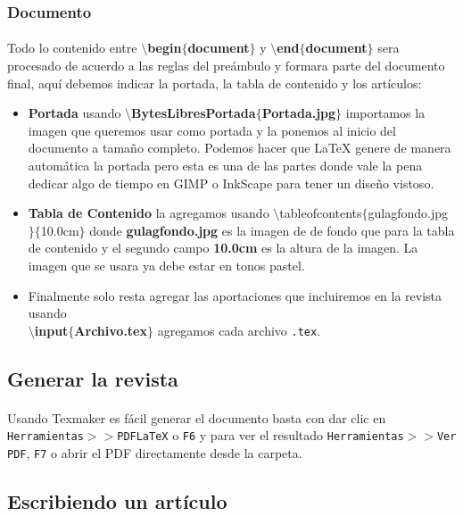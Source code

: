 \subsubsection*{Documento}
\paragraph{} Todo lo contenido entre \textbf{ $\setminus$begin$\{$document$\}$} y \textbf{ $\setminus$end$\{$document$\}$} sera procesado de acuerdo a las reglas del preámbulo y formara parte del documento final, aquí debemos indicar la portada, la tabla de contenido y los artículos:
\begin{itemize}
	\item \textbf{Portada} usando \textbf{$\setminus$BytesLibresPortada$\{$Portada.jpg$\}$} importamos la imagen que queremos usar como portada y la ponemos al inicio del documento a tamaño completo. Podemos hacer que \LaTeX{} genere de manera automática la portada pero esta es una de las partes donde vale la pena dedicar algo de tiempo en GIMP o InkScape para tener un diseño vistoso.
	\item \textbf{Tabla de Contenido} la agregamos usando $\setminus$tableofcontents$\{$gulagfondo.jpg$\}\{$10.0cm$\}$ donde \textbf{gulagfondo.jpg} es la imagen de de fondo que para la tabla de contenido y el segundo campo \textbf{10.0cm} es la altura de la imagen. La imagen que se usara ya debe estar en tonos pastel.
	\item Finalmente solo resta agregar las aportaciones que incluiremos en la revista usando \\ \textbf{$\setminus$input$\{$Archivo.tex$\}$} agregamos cada archivo \texttt{.tex}.
\end{itemize}

\subsection*{Generar la revista}
\paragraph{} Usando Texmaker es fácil generar el documento basta con dar clic en \texttt{Herramientas$>>$PDFLaTeX} o \texttt{F6} y para ver el resultado \texttt{Herramientas$>>$Ver PDF}, \texttt{F7} o abrir el PDF directamente desde la carpeta.

\subsection*{Escribiendo un artículo}
